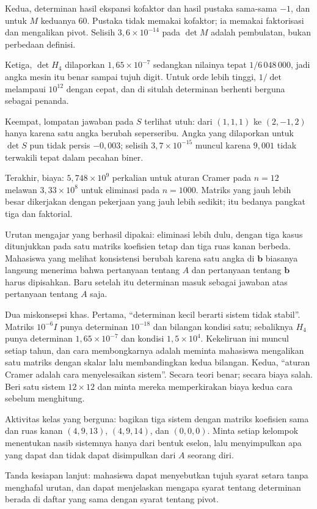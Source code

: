 Kedua, determinan hasil ekspansi kofaktor dan hasil pustaka sama-sama $-1$, dan untuk $M$
keduanya $60$. Pustaka tidak memakai kofaktor; ia memakai faktorisasi dan mengalikan pivot.
Selisih $3{,}6\times10^{-14}$ pada $\det M$ adalah pembulatan, bukan perbedaan definisi.

Ketiga, $\det H_{4}$ dilaporkan $1{,}65\times10^{-7}$ sedangkan nilainya tepat
$1/6\,048\,000$, jadi angka mesin itu benar sampai tujuh digit. Untuk orde lebih tinggi,
$1/\det$ melampaui $10^{12}$ dengan cepat, dan di situlah determinan berhenti berguna
sebagai penanda.

Keempat, lompatan jawaban pada $S$ terlihat utuh: dari $(1,1,1)$ ke $(2,-1,2)$ hanya karena
satu angka berubah seperseribu. Angka yang dilaporkan untuk $\det S$ pun tidak persis
$-0{,}003$; selisih $3{,}7\times10^{-15}$ muncul karena $9{,}001$ tidak terwakili tepat
dalam pecahan biner.

Terakhir, biaya: $5{,}748\times10^{9}$ perkalian untuk aturan Cramer pada $n=12$ melawan
$3{,}33\times10^{8}$ untuk eliminasi pada $n=1000$. Matriks yang jauh lebih besar dikerjakan
dengan pekerjaan yang jauh lebih sedikit; itu bedanya pangkat tiga dan faktorial.

\begin{untukdosen}
Urutan mengajar yang berhasil dipakai: eliminasi lebih dulu, dengan tiga kasus ditunjukkan
pada satu matriks koefisien tetap dan tiga ruas kanan berbeda. Mahasiswa yang melihat
konsistensi berubah karena satu angka di $\mathbf{b}$ biasanya langsung menerima bahwa
pertanyaan tentang $A$ dan pertanyaan tentang $\mathbf{b}$ harus dipisahkan. Baru setelah itu
determinan masuk sebagai jawaban atas pertanyaan tentang $A$ saja.

Dua miskonsepsi khas. Pertama, ``determinan kecil berarti sistem tidak stabil''. Matriks
$10^{-6}I$ punya determinan $10^{-18}$ dan bilangan kondisi satu; sebaliknya $H_{4}$ punya
determinan $1{,}65\times10^{-7}$ dan kondisi $1{,}5\times10^{4}$. Kekeliruan ini muncul
setiap tahun, dan cara membongkarnya adalah meminta mahasiswa mengalikan satu matriks
dengan skalar lalu membandingkan kedua bilangan. Kedua, ``aturan Cramer adalah cara
menyelesaikan sistem''. Secara teori benar; secara biaya salah. Beri satu sistem $12\times12$
dan minta mereka memperkirakan biaya kedua cara sebelum menghitung.

Aktivitas kelas yang berguna: bagikan tiga sistem dengan matriks koefisien sama dan ruas
kanan $(4,9,13)$, $(4,9,14)$, dan $(0,0,0)$. Minta setiap kelompok menentukan nasib
sistemnya hanya dari bentuk eselon, lalu menyimpulkan apa yang dapat dan tidak dapat
disimpulkan dari $A$ seorang diri.

Tanda kesiapan lanjut: mahasiswa dapat menyebutkan tujuh syarat setara tanpa menghafal
urutan, dan dapat menjelaskan mengapa syarat tentang determinan berada di daftar yang sama
dengan syarat tentang pivot.
\end{untukdosen}


